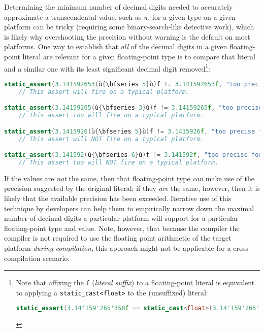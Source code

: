 Determining the minimum number of decimal digits needed to accurately
approximate a transcendental value, such as $\pi$, for a given type on
a given platform can be tricky (requiring some binary-search-like
detective work), which is likely why overshooting the precision without
warning is the default on most platforms. One way to establish that
\emph{all} of the decimal digits in a given floating-point literal are
relevant for a given floating-point type is to compare that literal and
a similar one with its least significant decimal digit
removed{\cprotect\footnote{Note that affixing the \lstinline!f!
(\emph{literal suffix}) to a floating-point literal is
equivalent to applying a \lstinline!static_cast<float>! to the
(unsuffixed) literal:

\begin{lstlisting}[language=C++, basicstyle={\ttfamily\footnotesize}]
static_assert(3.14'159'265'358f == static_cast<float>(3.14'159'265'358));
\end{lstlisting}\vspace*{-1ex}
      }}:

\begin{lstlisting}[language=C++]
static_assert(3.141592653(ù{\bfseries 5}ù)f != 3.141592653f, "too precise for float");
    // This assert will fire on a typical platform.

static_assert(3.14159265(ù{\bfseries 3}ù)f != 3.14159265f, "too precise for float");
    // This assert too will fire on a typical platform.

static_assert(3.1415926(ù{\bfseries 5}ù)f != 3.1415926f, "too precise for float");
    // This assert will NOT fire on a typical platform.

static_assert(3.141592(ù{\bfseries 6}ù)f != 3.141592f, "too precise for float");
    // This assert too will NOT fire on a typical platform.
\end{lstlisting}

\noindent If the values are \emph{not} the same, then that floating-point type
\emph{can} make use of the precision suggested by the original literal; if
they \emph{are} the same, however, then it is likely that the available
precision has been exceeded. Iterative use of this technique by
developers can help them to empirically narrow down the maximal number
of decimal digits a particular platform will support for a particular
floating-point type and value. Note, however, that because the compiler the compiler is not required to use the floating point arithmetic of the target platform \emph{during compilation}, this approach might not be applicable for a cross-compilation scenario.

